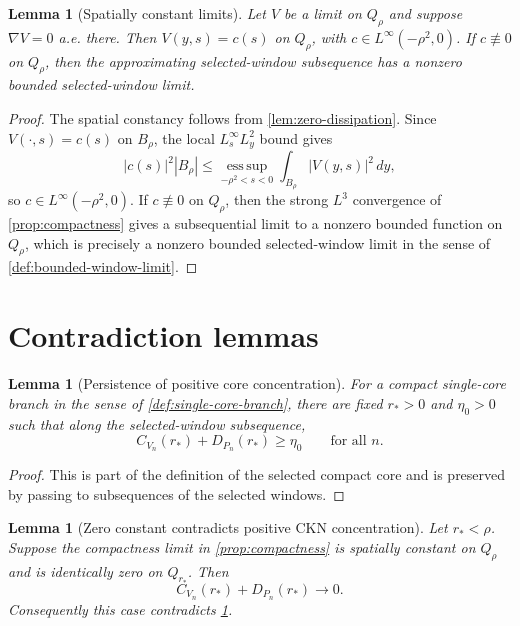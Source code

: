 \documentclass[11pt]{amsart}
\theoremstyle{plain}
\newtheorem{lemma}[theorem]{Lemma}
\theoremstyle{definition}
\theoremstyle{remark}
\begin{document}
\begin{lemma}[Spatially constant limits]\label{lem:constant-limit}
Let \(V\) be a limit on \(Q_\rho\) and suppose \(\nabla V=0\) a.e. there.
Then \(V(y,s)=c(s)\) on \(Q_\rho\), with
\(c\in L^\infty(-\rho^2,0)\).  If \(c\not\equiv0\) on \(Q_\rho\), then
the approximating selected-window subsequence has a nonzero bounded
selected-window limit.
\end{lemma}

\begin{proof}
The spatial constancy follows from \cref{lem:zero-dissipation}.  Since
\(V(\cdot,s)=c(s)\) on \(B_\rho\), the local \(L^\infty_sL^2_y\) bound gives
\[
  |c(s)|^2|B_\rho|\le \operatorname*{ess\,sup}_{-\rho^2<s<0}
  \int_{B_\rho}|V(y,s)|^2\,dy,
\]
so \(c\in L^\infty(-\rho^2,0)\).  If \(c\not\equiv0\) on \(Q_\rho\), then the
strong \(L^3\) convergence of \cref{prop:compactness} gives a subsequential
limit to a nonzero bounded function on \(Q_\rho\), which is precisely a nonzero
bounded selected-window limit in the sense of \cref{def:bounded-window-limit}.
\end{proof}

\section{Contradiction lemmas}

\begin{lemma}[Persistence of positive core concentration]\label{lem:persistence}
For a compact single-core branch in the sense of \cref{def:single-core-branch},
there are fixed \(r_*>0\) and \(\eta_0>0\) such that along the selected-window
subsequence,
\[
  C_{V_n}(r_*)+D_{P_n}(r_*)\ge\eta_0
  \qquad\text{for all }n.
\]
\end{lemma}

\begin{proof}
This is part of the definition of the selected compact core and is preserved by
passing to subsequences of the selected windows.
\end{proof}

\begin{lemma}[Zero constant contradicts positive CKN concentration]\label{lem:zero-contradiction}
Let \(r_*<\rho\).  Suppose the compactness limit in \cref{prop:compactness} is
spatially constant on \(Q_\rho\) and is identically zero on \(Q_{r_*}\).  Then
\[
  C_{V_n}(r_*)+D_{P_n}(r_*)\to0.
\]
Consequently this case contradicts \cref{lem:persistence}.
\end{lemma}
\end{document}
